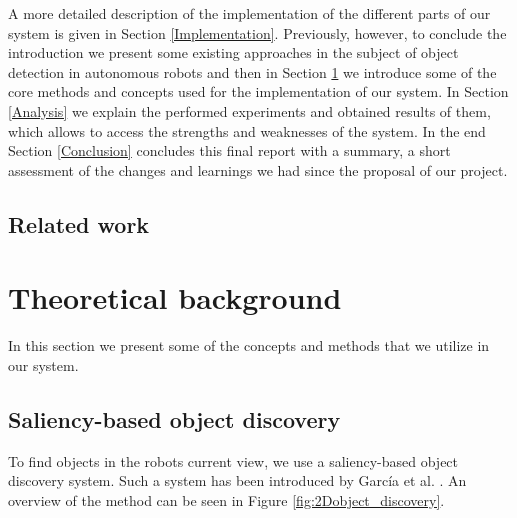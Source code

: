 \documentclass[a4paper,11pt,english]{article}
\begin{document}
\medskip

A more detailed description of the implementation of the different parts of our system is given in Section \ref{Implementation}.
Previously, however, to conclude the introduction we present some existing approaches in the subject of object detection in autonomous robots and then in Section \ref{Theoretical_background} we introduce some of the core methods and concepts used for the implementation of our system.
In Section \ref{Analysis} we explain the performed experiments and obtained results of them, which allows to access the strengths and weaknesses of the system. In the end Section \ref{Conclusion} concludes this final report with a summary, a short assessment of the changes and learnings we had since the proposal of our project.

\subsection{Related work}

\section{Theoretical background}
\label{Theoretical_background}

In this section we present some of the concepts and methods that we utilize in our system.

\subsection{Saliency-based object discovery}
To find objects in the robots current view, we use a saliency-based object discovery system.
Such a system has been introduced by García et al. \cite{garcia2015saliency}.
An overview of the method can be seen in Figure \ref{fig:2Dobject_discovery}.
\end{document}
